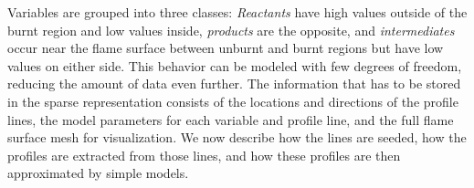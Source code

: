 %
Variables are grouped into three classes: \emph{Reactants} have high
values outside of the burnt region and low values inside,
\emph{products} are the opposite, and \emph{intermediates} occur near the flame
surface between unburnt and burnt regions but have low values on either side.
%
This behavior can be modeled with few degrees of freedom, reducing the amount of
data even further.
%
The information that has to be stored in the sparse representation consists of
the locations and directions of the profile lines, the model parameters for each
variable and profile line, and the full flame surface mesh for visualization.
%
%
We now describe how the lines are seeded, how the profiles are extracted from
those lines, and how these profiles are then approximated by simple models.
% 

